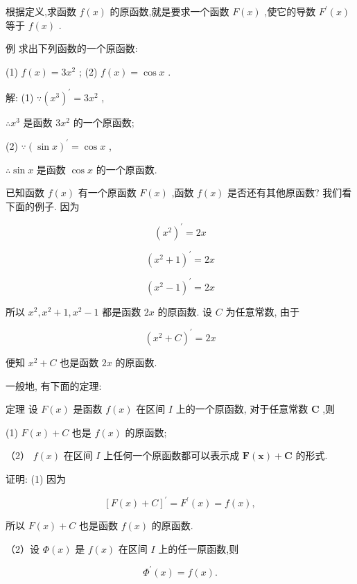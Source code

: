 \documentclass[10pt]{article}
\begin{document}
根据定义,求函数 \(f\left( x\right)\) 的原函数,就是要求一个函数 \(F\left( x\right)\) ,使它的导数 \({F}^{\prime }\left( x\right)\) 等于 \(f\left( x\right)\) .

例 求出下列函数的一个原函数:

(1) \(f\left( x\right) = 3{x}^{2}\) ; (2) \(f\left( x\right) = \cos x\) .

解: (1) \(\because {\left( {x}^{3}\right) }^{\prime } = 3{x}^{2}\) ,

\(\therefore {x}^{3}\) 是函数 \(3{x}^{2}\) 的一个原函数;

(2) \(\because {\left( \sin x\right) }^{\prime } = \cos x\) ,

\(\therefore \sin x\) 是函数 \(\cos x\) 的一个原函数.

已知函数 \(f\left( x\right)\) 有一个原函数 \(F\left( x\right)\) ,函数 \(f\left( x\right)\) 是否还有其他原函数? 我们看下面的例子. 因为

\[
{\left( {x}^{2}\right) }^{\prime } = {2x}
\]

\[
{\left( {x}^{2} + 1\right) }^{\prime } = {2x}
\]

\[
{\left( {x}^{2} - 1\right) }^{\prime } = {2x}
\]

所以 \({x}^{2},{x}^{2} + 1,{x}^{2} - 1\) 都是函数 \({2x}\) 的原函数. 设 \(C\) 为任意常数, 由于

\[
{\left( {x}^{2} + C\right) }^{\prime } = {2x}
\]

便知 \({x}^{2} + C\) 也是函数 \({2x}\) 的原函数.

一般地, 有下面的定理:

定理 设 \(F\left( x\right)\) 是函数 \(f\left( x\right)\) 在区间 \(I\) 上的一个原函数, 对于任意常数 \(\mathbf{C}\) ,则

(1) \(F\left( x\right) + C\) 也是 \(f\left( x\right)\) 的原函数;

（2） \(f\left( x\right)\) 在区间 \(I\) 上任何一个原函数都可以表示成 \(\mathbf{F}\left( \mathbf{x}\right) + \mathbf{C}\) 的形式.

证明: (1) 因为

\[
{\left\lbrack F\left( x\right) + C\right\rbrack }^{\prime } = {F}^{\prime }\left( x\right) = f\left( x\right) ,
\]

所以 \(F\left( x\right) + C\) 也是函数 \(f\left( x\right)\) 的原函数.

（2）设 \(\Phi \left( x\right)\) 是 \(f\left( x\right)\) 在区间 \(I\) 上的任一原函数,则

\[
{\Phi }^{\prime }\left( x\right) = f\left( x\right) .
\]
\end{document}
